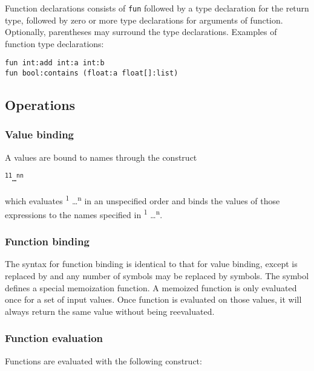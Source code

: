 Function declarations consists of \texttt{fun} followed by a type declaration for the return type, followed by zero or more type declarations for arguments of function. Optionally, parentheses may surround the type declarations. Examples of function type declarations: 

\texttt{fun int:add int:a int:b}\\
\texttt{fun bool:contains (float:a float[]:list)}

\subsection{Operations}

\subsubsection{Value binding}

A values are bound to names through the construct 

\begin{alltt}
\quad {}\textsuperscript{1} \term{=} \textsuperscript{1}   \dots {} \textsuperscript{n} \term{=} \textsuperscript{n}   
\end{alltt}

which evaluates  \textsuperscript{1} \dots  {}\textsuperscript{n} in an unspecified order and binds the values of those expressions to the names specified in \textsuperscript{1} \dots {}\textsuperscript{n}.

\subsubsection{Function binding}

The syntax for function binding is identical to that for value binding, except  is replaced by  and any number of \term{=} symbols may be replaced by \term{:=} symbols. The \term{:=} symbol defines a special memoization function. A memoized function is only evaluated once for a set of input values. Once function is evaluated on those values, it will always return the same value without being reevaluated. 

\subsubsection{Function evaluation}
Functions are evaluated with the following construct:

